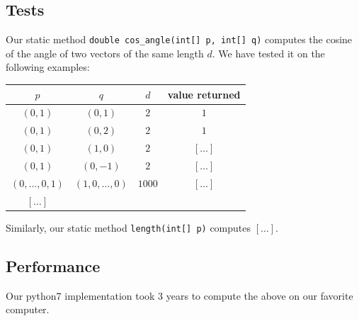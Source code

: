 \documentclass{tufte-handout}
\begin{document}
  \subsection{Tests}

  Our static method {\tt double cos\_angle(int[] p, int[] q)} computes the cosine of the angle of two vectors of the same length $d$.
  We have tested it on the following examples:

  \bigskip\noindent
{ \small\sf
  \begin{tabular}{cccc}
  \toprule
  $p$     & $q$     & $d$ & value returned \\\midrule
  $(0,1)$ & $(0,1)$ & $2$ & $1$ \\
  $(0,1)$ & $(0,2)$ & $2$ & $1$\\
  $(0,1)$ & $(1,0)$ & $2$ & $[\ldots]$\\
  $(0,1)$ & $(0,-1)$ & $2$ & $[\ldots]$\\
  $(0,\ldots,0,1)$ & $(1,0,\ldots,0)$ & $1000$ & $[\ldots]$\\
  $[\ldots]$ \\
  \bottomrule
  \end{tabular}
}

\bigskip
  Similarly, our static method {\tt length(int[] p)} computes $[\ldots]$.
  \subsection{Performance}
  Our python7 implementation took 3 years to compute the above on our favorite computer.
\end{document}
